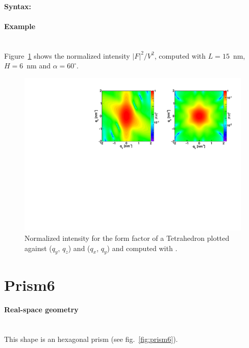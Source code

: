 \paragraph{Syntax:} 

\paragraph{Example}\mbox{}\\
Figure~\ref{fig:FFtetrahEx} shows the normalized intensity
$|F|^2/V^2$, computed with $L=15$~nm, $H=6$~nm and $\alpha =60
^{\circ}$.

\begin{figure}[ht]
\begin{center}
\includegraphics[angle=-90,width=\textwidth]{Figures/ff/figfftetrahedron.pdf}
\end{center}
\caption{Normalized intensity for the form factor of a Tetrahedron
  plotted against ($q_y$, $q_z$) and  ($q_x$, $q_y$) and
  computed with .}
\label{fig:FFtetrahEx}
\end{figure}


\newpage
\section{Prism6} 

\paragraph{Real-space geometry}\mbox{}\\
This shape is an hexagonal prism (see fig.~\ref{fig:prism6}).

